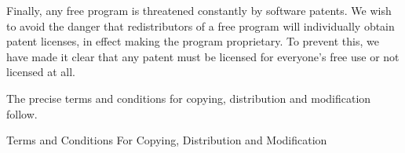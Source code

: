 \documentclass{article}
\begin{document}
      Finally, any free program is threatened constantly by software patents.
      We wish to avoid the danger that redistributors of a free program will
      individually obtain patent licenses, in effect making the program
      proprietary.  To prevent this, we have made it clear that any patent must
      be licensed for everyone's free use or not licensed at all.
      
      The precise terms and conditions for copying, distribution and
      modification follow.
      
      \begin{center}
      {\Large \sc Terms and Conditions For Copying, Distribution and
        Modification}
      \end{center}
      
      
\end{document}
